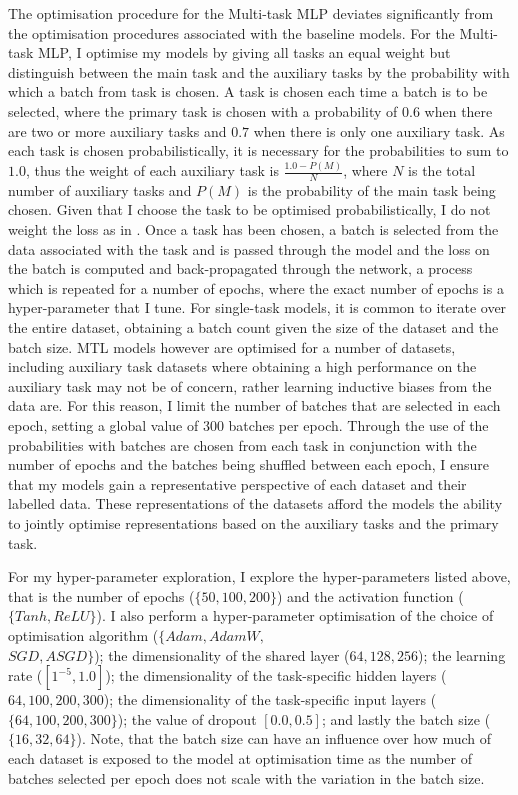 The optimisation procedure for the Multi-task MLP deviates significantly from the optimisation procedures associated with the baseline models.
For the Multi-task MLP, I optimise my models by giving all tasks an equal weight but distinguish between the main task and the auxiliary tasks by the probability with which a batch from task is chosen.
A task is chosen each time a batch is to be selected, where the primary task is chosen with a probability of $0.6$ when there are two or more auxiliary tasks and $0.7$ when there is only one auxiliary task.
As each task is chosen probabilistically, it is necessary for the probabilities to sum to $1.0$, thus the weight of each auxiliary task is $\frac{1.0-P(M)}{N}$, where $N$ is the total number of auxiliary tasks and $P(M)$ is the probability of the main task being chosen.
Given that I choose the task to be optimised probabilistically, I do not weight the loss as in \citet{Rajamanickam:2020}.
Once a task has been chosen, a batch is selected from the data associated with the task and is passed through the model and the loss on the batch is computed and back-propagated through the network, a process which is repeated for a number of epochs, where the exact number of epochs is a hyper-parameter that I tune.
For single-task models, it is common to iterate over the entire dataset, obtaining a batch count given the size of the dataset and the batch size.
MTL models however are optimised for a number of datasets, including auxiliary task datasets where obtaining a high performance on the auxiliary task may not be of concern, rather learning inductive biases from the data are.
For this reason, I limit the number of batches that are selected in each epoch, setting a global value of $300$ batches per epoch.
Through the use of the probabilities with batches are chosen from each task in conjunction with the number of epochs and the batches being shuffled between each epoch, I ensure that my models gain a representative perspective of each dataset and their labelled data.
These representations of the datasets afford the models the ability to jointly optimise representations based on the auxiliary tasks and the primary task.

For my hyper-parameter exploration, I explore the hyper-parameters listed above, that is the number of epochs ($\{50, 100, 200\}$) and the activation function ($\{Tanh, ReLU\}$).
I also perform a hyper-parameter optimisation of the choice of optimisation algorithm ($\{Adam, AdamW,$\\$SGD,ASGD\}$); the dimensionality of the shared layer (${64, 128, 256}$); the learning rate ($[1^{-5}, 1.0]$); the dimensionality of the task-specific hidden layers (${64, 100, 200, 300}$); the dimensionality of the task-specific input layers ($\{64, 100, 200, 300\}$); the value of dropout $[0.0, 0.5]$; and lastly the batch size ($\{16, 32, 64\}$).
Note, that the batch size can have an influence over how much of each dataset is exposed to the model at optimisation time as the number of batches selected per epoch does not scale with the variation in the batch size.

